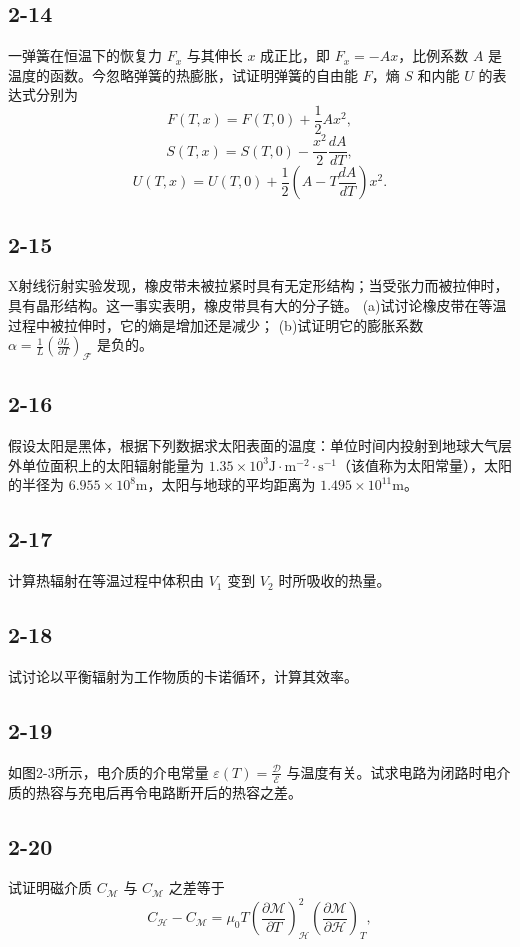 \newpage
\subsection{2-14}
一弹簧在恒温下的恢复力 $F_x$ 与其伸长 $x$ 成正比，即 $F_x = -Ax$，比例系数 $A$ 是温度的函数。今忽略弹簧的热膨胀，试证明弹簧的自由能 $F$，熵 $S$ 和内能 $U$ 的表达式分别为
$$F(T,x) = F(T,0) + \frac{1}{2} Ax^2,$$
$$S(T,x) = S(T,0) - \frac{x^2}{2} \frac{dA}{dT},$$
$$U(T,x) = U(T,0) + \frac{1}{2} \left( A - T \frac{dA}{dT} \right)x^2.$$

\newpage
\subsection{2-15}
X射线衍射实验发现，橡皮带未被拉紧时具有无定形结构；当受张力而被拉伸时，具有晶形结构。这一事实表明，橡皮带具有大的分子链。
(a)试讨论橡皮带在等温过程中被拉伸时，它的熵是增加还是减少；
(b)试证明它的膨胀系数 $\alpha = \frac{1}{L} \left( \frac{\partial L}{\partial T} \right)_\mathcal{F}$ 是负的。

\newpage
\subsection{2-16}
假设太阳是黑体，根据下列数据求太阳表面的温度：单位时间内投射到地球大气层外单位面积上的太阳辐射能量为 $1.35 \times 10^3  \mathrm{J \cdot m^{-2} \cdot s^{-1}}$（该值称为太阳常量），太阳的半径为 $6.955 \times 10^8  \mathrm{m}$，太阳与地球的平均距离为 $1.495 \times 10^{11}  \mathrm{m}$。

\newpage
\subsection{2-17}
计算热辐射在等温过程中体积由 $V_1$ 变到 $V_2$ 时所吸收的热量。

\newpage
\subsection{2-18}
试讨论以平衡辐射为工作物质的卡诺循环，计算其效率。

\newpage
\subsection{2-19}
如图2-3所示，电介质的介电常量 $\varepsilon (T) = \frac{\mathscr{D}}{\mathscr{E}}$ 与温度有关。试求电路为闭路时电介质的热容与充电后再令电路断开后的热容之差。

\newpage
\subsection{2-20}
试证明磁介质 $C_{\mathscr{M}}$ 与 $C_{\mathscr{M}}$ 之差等于
$$C_{\mathscr{H}} - C_{\mathscr{M}} = \mu_0 T \left( \frac{\partial \mathscr{M}}{\partial T} \right)_{\mathscr{H}}^2 \left( \frac{\partial \mathscr{M}}{\partial \mathscr{H}} \right)_T,$$

